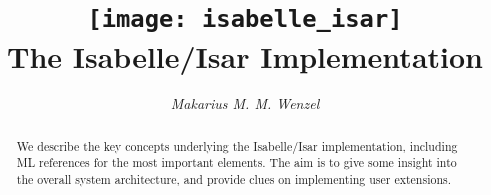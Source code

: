 \documentclass[12pt,a4paper,fleqn]{report}
\title{\texttt{[image: isabelle\_isar]}
  \\[4ex] The Isabelle/Isar Implementation}
\author{\emph{Makarius M. M. Wenzel}}
\begin{document}
\maketitle 

\begin{abstract}
  We describe the key concepts underlying the Isabelle/Isar
  implementation, including ML references for the most important
  elements.  The aim is to give some insight into the overall system
  architecture, and provide clues on implementing user extensions.
\end{abstract}

 \tableofcontents \clearfirst









%

%

\appendix


\begingroup
\tocentry{\bibname}
 \small\raggedright\frenchspacing

\endgroup

\tocentry{\glossaryname}
\printglossary

\tocentry{\indexname}
\printindex
\end{document}
